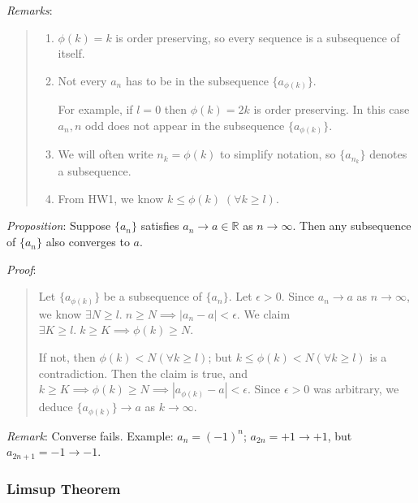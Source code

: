 \documentclass[11pt]{article}
\begin{document}
\emph{Remarks}:
\begin{quote}\vspace{-0.3cm}
	\begin{enumerate}
	\item $\phi(k) = k$ is order preserving, so every sequence is a subsequence of itself.
	\item Not every $a_n$ has to be in the subsequence $\{a_{\phi(k)}\}$.

	For example, if $l = 0$ then $\phi(k) = 2k$ is order preserving. In this case $a_n, n$ odd does not appear in the subsequence $\{a_{\phi(k)}\}$.

	\item We will often write $n_k = \phi(k)$ to simplify notation, so $\{a_{n_k}\}$ denotes a subsequence.
	\item From HW1, we know $k \leq \phi(k) \; (\forall k \geq l)$.
	\end{enumerate}
\end{quote}

\emph{Proposition}: Suppose $\{a_n\}$ satisfies $a_n \to a \in \mathbb{R}$ as $n \to \infty$. Then any subsequence of $\{a_n\}$ also converges to $a$.

\emph{Proof}:
\begin{quote}\vspace{-0.3cm}
Let $\{a_{\phi(k)}\}$ be a subsequence of $\{a_n\}$. Let $\epsilon > 0$. Since $a_n \to a$ as $n \to \infty$, we know $\exists N \geq l.\; n \geq N \implies |a_n - a| < \epsilon$. We claim $\exists K \geq l.\; k \geq K \implies \phi(k) \geq N$.

If not, then $\phi(k) < N (\forall k \geq l)$; but $k \leq \phi(k) < N (\forall k \geq l)$ is a contradiction. Then the claim is true, and $k \geq K \implies \phi(k) \geq N \implies |a_{\phi(k)} - a| < \epsilon$. Since $\epsilon > 0$ was arbitrary, we deduce $\{a_{\phi(k)}\} \to a$ as $k \to \infty$.
\end{quote}

\emph{Remark}: Converse fails. Example: $a_n = (-1)^n$; $a_{2n} = +1 \to +1$, but $a_{2n+1} = -1 \to -1$.

\subsubsection{Limsup Theorem}
\end{document}
